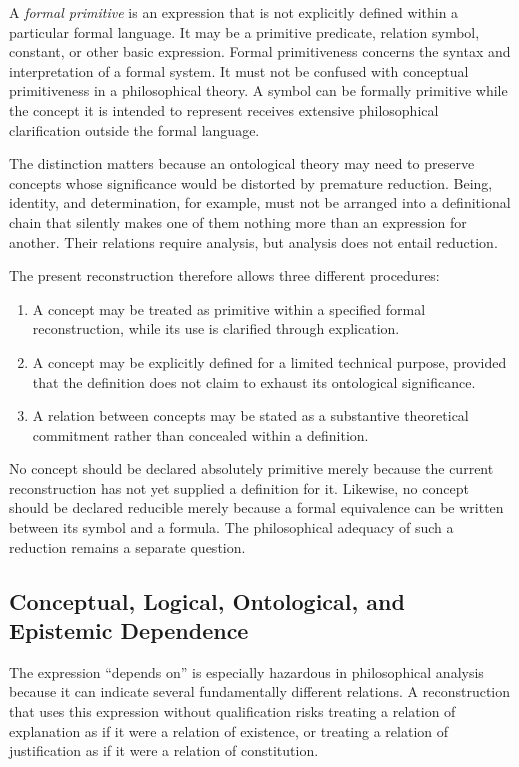 A \emph{formal primitive} is an expression that is not explicitly
defined within a particular formal language. It may be a primitive
predicate, relation symbol, constant, or other basic expression.
Formal primitiveness concerns the syntax and interpretation of a
formal system. It must not be confused with conceptual primitiveness
in a philosophical theory. A symbol can be formally primitive while
the concept it is intended to represent receives extensive
philosophical clarification outside the formal language.

The distinction matters because an ontological theory may need to
preserve concepts whose significance would be distorted by premature
reduction. Being, identity, and determination, for example, must not
be arranged into a definitional chain that silently makes one of them
nothing more than an expression for another. Their relations require
analysis, but analysis does not entail reduction.

The present reconstruction therefore allows three different
procedures:

\begin{enumerate}
  \item A concept may be treated as primitive within a specified
  formal reconstruction, while its use is clarified through
  explication.
  \item A concept may be explicitly defined for a limited technical
  purpose, provided that the definition does not claim to exhaust
  its ontological significance.
  \item A relation between concepts may be stated as a substantive
  theoretical commitment rather than concealed within a definition.
\end{enumerate}

No concept should be declared absolutely primitive merely because the
current reconstruction has not yet supplied a definition for it.
Likewise, no concept should be declared reducible merely because a
formal equivalence can be written between its symbol and a formula.
The philosophical adequacy of such a reduction remains a separate
question.

\subsection{Conceptual, Logical, Ontological, and Epistemic Dependence}

The expression ``depends on'' is especially hazardous in philosophical
analysis because it can indicate several fundamentally different
relations. A reconstruction that uses this expression without
qualification risks treating a relation of explanation as if it were
a relation of existence, or treating a relation of justification as
if it were a relation of constitution.

